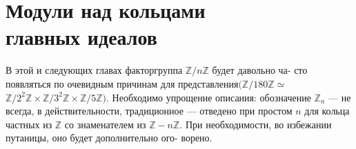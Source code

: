 
\chapter{Модули над кольцами\\главных идеалов}
\noindent В этой и следующих главах факторгруппа $\mathbb{Z}/n\mathbb{Z}$ будет давольно ча-\linebreak
сто появляться по очевидным причинам для представления$(\mathbb{Z}/180\mathbb{Z}\simeq$ \linebreak
 $\mathbb{Z}/2^2\mathbb{Z}\times \mathbb{Z}/3^2\mathbb{Z}\times \mathbb{Z}/5\mathbb{Z})$. Необходимо упрощение описания: обозначение \linebreak
  $\mathbb{Z}_n$ --- не всегда, в действительности, традиционное --- отведено при \linebreak простом $n$ для кольца частных из $\mathbb{Z}$ со знаменателем из $\mathbb{Z}-n\mathbb{Z}$. При \linebreak необходимости, во избежании путаницы, оно будет дополнительно ого- \linebreak ворено.  

